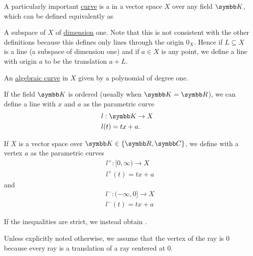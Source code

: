 \begin{definition}\label{def:geometric_line}
  A particularly important \hyperref[def:hypersurface]{curve} is a  in a vector space \( X \) over any field \( \BK \), which can be defined equivalently as

  \begin{defenum}
     A subspace of \( X \) of \hyperref[def:vector_space_dimension]{dimension} one. Note that this is not consistent with the other definitions because this defines only lines through the origin \( 0_X \). Hence if \( L \subseteq X \) is a line (a subspace of dimension one) and if \( a \in X \) is any point, we define a line with origin \( a \) to be the translation \( a + L \).

     An \hyperref[def:affine_variety/algebraic_curve]{algebraic curve} in \( X \) given by a polynomial of degree one.

     If the field \( \BK \) is ordered (usually when \( \BK = \BR \)), we can define a line with  \( x \) and  \( a \) as the parametric curve
    \begin{align*}
      &l: \BK \to X \\
      &l(t) = tx + a.
    \end{align*}
  \end{defenum}
\end{definition}

\begin{definition}\label{def:geometric_ray}
  If \( X \) is a vector space over \( \BK \in \{ \BR, \BC \} \), we define  with a vertex \( a \) as the parametric curves
  \begin{align*}
    &l^+: [0, \infty) \to X \\
    &l^+(t) = tx + a
  \end{align*}
  and
  \begin{align*}
    &l^-: (-\infty, 0] \to X \\
    &l^-(t) = tx + a
  \end{align*}

  If the inequalities are strict, we instead obtain .

  Unless explicitly noted otherwise, we assume that the vertex of the ray is \( 0 \) because every ray is a translation of a ray centered at \( 0 \).
\end{definition}

